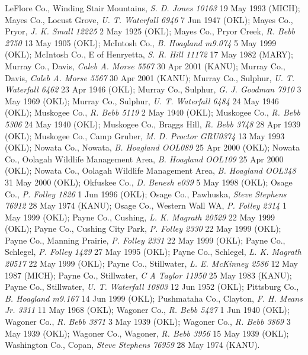 \documentclass{article}
\begin{document}
LeFlore Co., Winding Stair Mountains, \textit{S. D. Jones 10163} 19 May 1993 (MICH); 
Mayes Co., Locust Grove, \textit{U. T. Waterfall 6946} 7 Jun 1947 (OKL); 
Mayes Co., Pryor, \textit{J. K. Small 12225} 2 May 1925 (OKL); 
Mayes Co., Pryor Creek, \textit{R. Bebb 2750} 13 May 1905 (OKL); 
McIntosh Co., \textit{B. Hoagland m9.074} 5 May 1999 (OKL); 
McIntosh Co., E of Henryetta, \textit{S. R. Hill 11172} 17 May 1982 (MARY); 
Murray Co., Davis, \textit{Caleb A. Morse 5567} 30 Apr 2001 (KANU); 
Murray Co., Davis, \textit{Caleb A. Morse 5567} 30 Apr 2001 (KANU); 
Murray Co., Sulphur, \textit{U. T. Waterfall 6462} 23 Apr 1946 (OKL); 
Murray Co., Sulphur, \textit{G. J. Goodman 7910} 3 May 1969 (OKL); 
Murray Co., Sulphur, \textit{U. T. Waterfall 6484} 24 May 1946 (OKL); 
Muskogee Co., \textit{R. Bebb 5119} 2 May 1940 (OKL); 
Muskogee Co., \textit{R. Bebb 5306} 24 May 1940 (OKL); 
Muskogee Co., Braggs Hill, \textit{R. Bebb 3748} 28 Apr 1939 (OKL); 
Muskogee Co., Camp Gruber, \textit{M. D. Proctor GRU0374} 13 May 1993 (OKL); 
Nowata Co., Nowata, \textit{B. Hoagland OOL089} 25 Apr 2000 (OKL); 
Nowata Co., Oolagah Wildlife Management Area, \textit{B. Hoagland OOL109} 25 Apr 2000 (OKL); 
Nowata Co., Oolagah Wildlife Management Area, \textit{B. Hoagland OOL348} 31 May 2000 (OKL); 
Okfuskee Co., \textit{D. Benesh e039} 5 May 1998 (OKL); 
Osage Co., \textit{P. Folley 1826} 1 Jun 1996 (OKL); 
Osage Co., Pawhuska, \textit{Steve Stephens 76912} 28 May 1974 (KANU); 
Osage Co., Western Wall WA, \textit{P. Folley 2314} 1 May 1999 (OKL); 
Payne Co., Cushing, \textit{L. K. Magrath 20529} 22 May 1999 (OKL); 
Payne Co., Cushing City Park, \textit{P. Folley 2330} 22 May 1999 (OKL); 
Payne Co., Manning Prairie, \textit{P. Folley 2331} 22 May 1999 (OKL); 
Payne Co., Schlegel, \textit{P. Folley 1429} 27 May 1995 (OKL); 
Payne Co., Schlegel, \textit{L. K. Magrath 20517} 22 May 1999 (OKL); 
Payne Co., Stillwater, \textit{L. E. McKinney 2586} 12 May 1987 (MICH); 
Payne Co., Stillwater, \textit{C A Taylor 11950} 25 May 1983 (KANU); 
Payne Co., Stillwater, \textit{U. T. Waterfall 10803} 12 Jun 1952 (OKL); 
Pittsburg Co., \textit{B. Hoagland m9.167} 14 Jun 1999 (OKL); 
Pushmataha Co., Clayton, \textit{F. H. Means Jr. 3311} 11 May 1968 (OKL); 
Wagoner Co., \textit{R. Bebb 5427} 1 Jun 1940 (OKL); 
Wagoner Co., \textit{R. Bebb 3871} 3 May 1939 (OKL); 
Wagoner Co., \textit{R. Bebb 3869} 3 May 1939 (OKL); 
Wagoner Co., Wagoner, \textit{R. Bebb 3956} 15 May 1939 (OKL); 
Washington Co., Copan, \textit{Steve Stephens 76959} 28 May 1974 (KANU). 
\end{document}
